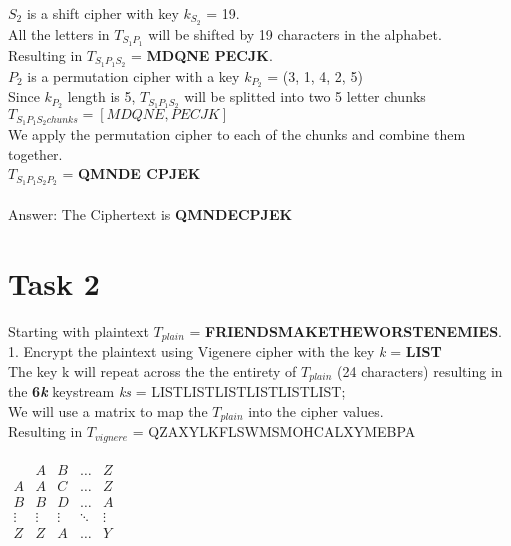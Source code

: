 \documentclass{article}
\begin{document}
$S_2$ is a shift cipher with key $k_{S_2}$ = 19. \\
All the letters in \textit{$T_{S_1 P_1}$} will be shifted by 19 characters in the alphabet.\\
Resulting in \textit{$T_{S_1 P_1 S_2}$} = \textbf{MDQNE PECJK}. \\

$P_2$ is a permutation cipher with a key $k_{P_2}$ = (3, 1, 4, 2, 5) \\
Since $k_{P_2}$ length is 5, \textit{$T_{S_1 P_1 S_2}$} will be splitted into two 5 letter chunks\\
\begin{math}
    \mathit{{T_{S_1 P_1 S_2 chunks}} = [MDQNE, PECJK]}
\end{math}\\
We apply the permutation cipher to each of the chunks and combine them together.\\
\textit{$T_{S_1 P_1 S_2 P_2}$} =  \textbf{QMNDE CPJEK}
\\
\\
Answer: The Ciphertext is \textbf{QMNDECPJEK}


\section{Task 2}
Starting with plaintext \textit{$T_{plain}$} = \textbf{FRIENDSMAKETHEWORSTENEMIES}. \\

1. Encrypt the plaintext using Vigenere cipher with the key \textit{k} = \textbf{LIST} \\
The key k will repeat across the the entirety of \textit{$T_{plain}$} (24 characters) resulting in \\
the \textbf{6\textit{k}} keystream \textit{ks} = LISTLISTLISTLISTLISTLIST; \\ 
We will use a matrix to map the \textit{$T_{plain}$} into the cipher values.\\ 
Resulting in \textit{$T_{vignere}$} = QZAXYLKFLSWMSMOHCALXYMEBPA \\\\
$
\begin{array}{l|cccc}
    & A    & B    & \dots  & Z    \\ \hline
A   & A    & C & \dots  & Z \\
B   & B    & D & \dots  & A \\
\vdots & \vdots & \vdots & \ddots & \vdots \\
Z   & Z    & A & \dots  & Y
\end{array}
$\\ \\
\end{document}
